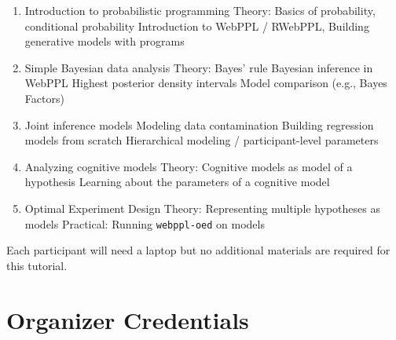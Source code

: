 \documentclass[10pt,letterpaper]{article}
\providecommand{\tightlist}{%
  \setlength{\itemsep}{0pt}\setlength{\parskip}{0pt}}
\begin{document}
\begin{enumerate}
\tightlist
\item Introduction to probabilistic programming
	\subitem Theory: Basics of probability, conditional probability
	\subitem Introduction to WebPPL / RWebPPL, 
	\subitem Building generative models with programs
\item Simple Bayesian data analysis
	\subitem Theory: Bayes' rule
	\subitem Bayesian inference in WebPPL
	\subitem Highest posterior density intervals
	\subitem Model comparison (e.g., Bayes Factors)
\item Joint inference models
	\subitem Modeling data contamination
	\subitem Building regression models from scratch 
	\subitem Hierarchical modeling  / participant-level parameters
\item Analyzing cognitive models
	\subitem Theory: Cognitive models as model of a hypothesis
	\subitem Learning about the parameters of a cognitive model
\item Optimal Experiment Design
	\subitem Theory: Representing multiple hypotheses as models 
	\subitem Practical: Running \texttt{webppl-oed} on models
\end{enumerate}

Each participant will need a laptop but no additional materials are required for this tutorial. 

\section{Organizer Credentials}
\end{document}
